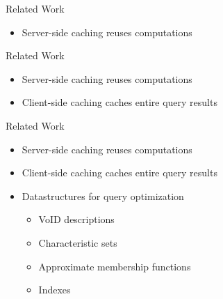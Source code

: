 \begin{frame}{Related Work}
    \begin{overlayarea}{\textwidth}{.8\textheight}
        \begin{itemize}
            \setlength\itemsep{1em}
            \item Server-side caching reuses computations \cite{papailiou2015graph, madkour2018worq}
        \end{itemize}
    \end{overlayarea}
\end{frame}

\begin{frame}{Related Work}
    \begin{overlayarea}{\textwidth}{.8\textheight}
        \begin{itemize}
            \setlength\itemsep{1em}
            \item Server-side caching reuses computations \cite{papailiou2015graph, madkour2018worq}
            \item Client-side caching caches entire query results \cite{zhang2018learning}
        \end{itemize}
    \end{overlayarea}
\end{frame}

\begin{frame}{Related Work}
    \begin{overlayarea}{\textwidth}{.8\textheight}
        \begin{itemize}
            \setlength\itemsep{1em}
            \item Server-side caching reuses computations \cite{papailiou2015graph, madkour2018worq}
            \item Client-side caching caches entire query results \cite{zhang2018learning}
            \item Datastructures for query optimization
            \begin{itemize}
                \item VoID descriptions \cite{alexander2011describing}
                \item Characteristic sets \cite{neumann2011characteristic}
                \item Approximate membership functions \cite{aebeloe2019decentralized, aebeloe2022lothbrok}
                \item Indexes
            \end{itemize}
        \end{itemize}
    \end{overlayarea}
\end{frame}

